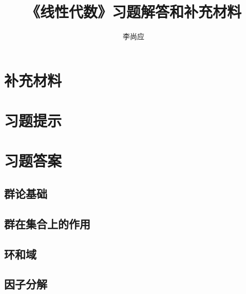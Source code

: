 \documentclass{ctexbook}
\title{《线性代数》习题解答和补充材料}
\author{李尚应}
\begin{document}
	\maketitle
	\tableofcontents
	\part*{}
	
	
	
	\part{补充材料}
	\setcounter{chapter}{0}
	\setcounter{chapter}{7}
	\part{习题提示}
	\part{习题答案}
	\setcounter{chapter}{0}
	\chapter{群论基础}
	\chapter{群在集合上的作用}
	\chapter{环和域}
	\chapter{因子分解}
\end{document}
